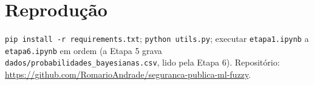 \documentclass[10pt,a4paper,twocolumn]{article}
\begin{document}
\section{Reprodução}
\texttt{pip install -r requirements.txt}; \texttt{python utils.py}; executar \texttt{etapa1.ipynb} a
\texttt{etapa6.ipynb} em ordem (a Etapa 5 grava \texttt{dados/probabilidades\_bayesianas.csv}, lido
pela Etapa 6). Repositório: \url{https://github.com/RomarioAndrade/seguranca-publica-ml-fuzzy}.
\end{document}

